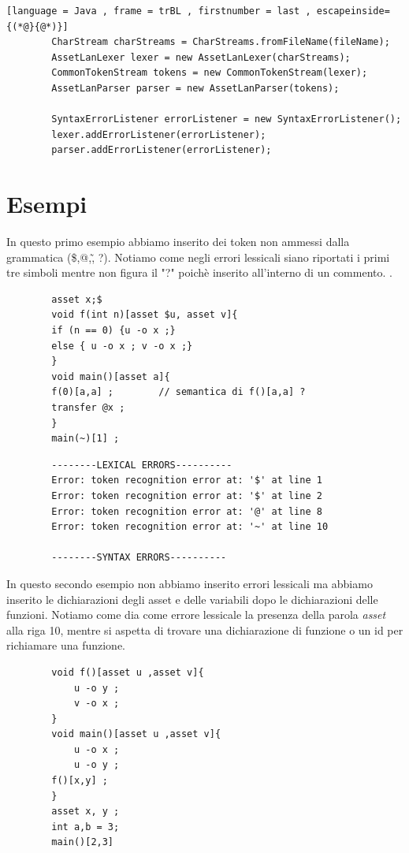 \documentclass[12pt, a4paper]{report}
\begin{document}
    \begin{lstlisting}[language = Java , frame = trBL , firstnumber = last , escapeinside={(*@}{@*)}]
        CharStream charStreams = CharStreams.fromFileName(fileName);
        AssetLanLexer lexer = new AssetLanLexer(charStreams);
        CommonTokenStream tokens = new CommonTokenStream(lexer);
        AssetLanParser parser = new AssetLanParser(tokens);

        SyntaxErrorListener errorListener = new SyntaxErrorListener();
        lexer.addErrorListener(errorListener);
        parser.addErrorListener(errorListener);
    \end{lstlisting}
    \section{Esempi}
    In questo primo esempio abbiamo inserito dei token non ammessi dalla grammatica (\$,@,\~, ?). Notiamo come negli errori lessicali siano riportati i primi tre simboli mentre non figura il "?" poichè inserito all'interno di un commento. . 
    \begin{lstlisting}
        asset x;$
        void f(int n)[asset $u, asset v]{
        if (n == 0) {u -o x ;}
        else { u -o x ; v -o x ;}
        }
        void main()[asset a]{
        f(0)[a,a] ;        // semantica di f()[a,a] ?
        transfer @x ;
        }
        main(~)[1] ;
    \end{lstlisting}
   \begin{lstlisting}
        --------LEXICAL ERRORS----------
        Error: token recognition error at: '$' at line 1
        Error: token recognition error at: '$' at line 2
        Error: token recognition error at: '@' at line 8
        Error: token recognition error at: '~' at line 10

        --------SYNTAX ERRORS----------
       \end{lstlisting}
   In questo secondo esempio non abbiamo inserito errori lessicali ma abbiamo inserito le dichiarazioni degli asset e delle variabili dopo le dichiarazioni delle funzioni. Notiamo come dia come errore lessicale la presenza della parola \emph{asset} alla riga 10, mentre si aspetta di trovare una dichiarazione di funzione o un id per richiamare una funzione.
   
    \begin{lstlisting}
        void f()[asset u ,asset v]{
            u -o y ;
            v -o x ;
        }
        void main()[asset u ,asset v]{
            u -o x ;
            u -o y ;
        f()[x,y] ;
        }
        asset x, y ;
        int a,b = 3;
        main()[2,3]
    \end{lstlisting}
    
\end{document}
